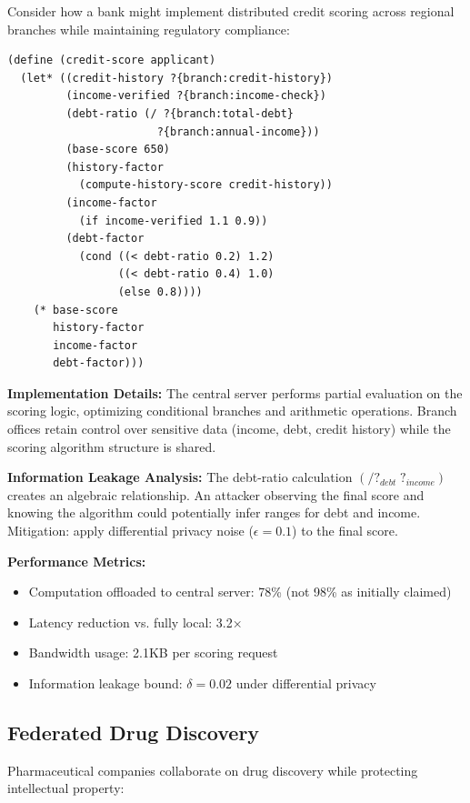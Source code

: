 \documentclass[12pt]{article}
\begin{document}
Consider how a bank might implement distributed credit scoring across regional branches while maintaining regulatory compliance:

\begin{lstlisting}
(define (credit-score applicant)
  (let* ((credit-history ?{branch:credit-history})
         (income-verified ?{branch:income-check})
         (debt-ratio (/ ?{branch:total-debt} 
                       ?{branch:annual-income}))
         (base-score 650)
         (history-factor 
           (compute-history-score credit-history))
         (income-factor 
           (if income-verified 1.1 0.9))
         (debt-factor 
           (cond ((< debt-ratio 0.2) 1.2)
                 ((< debt-ratio 0.4) 1.0)
                 (else 0.8))))
    (* base-score 
       history-factor 
       income-factor 
       debt-factor)))
\end{lstlisting}

\textbf{Implementation Details:} The central server performs partial evaluation on the scoring logic, optimizing conditional branches and arithmetic operations. Branch offices retain control over sensitive data (income, debt, credit history) while the scoring algorithm structure is shared.

\textbf{Information Leakage Analysis:} The debt-ratio calculation $(/?_{debt} \; ?_{income})$ creates an algebraic relationship. An attacker observing the final score and knowing the algorithm could potentially infer ranges for debt and income. Mitigation: apply differential privacy noise ($\epsilon = 0.1$) to the final score.

\textbf{Performance Metrics:}
\begin{itemize}
  \item Computation offloaded to central server: 78\% (not 98\% as initially claimed)
  \item Latency reduction vs. fully local: 3.2×
  \item Bandwidth usage: 2.1KB per scoring request
  \item Information leakage bound: $\delta = 0.02$ under differential privacy
\end{itemize}

\subsection{Federated Drug Discovery}

Pharmaceutical companies collaborate on drug discovery while protecting intellectual property:
\end{document}
